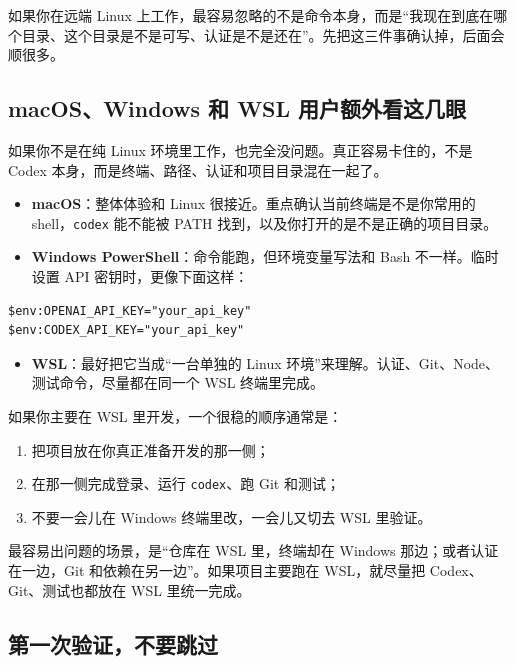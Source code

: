 \documentclass[UTF8,a4paper,12pt]{ctexart}
\begin{document}
\begin{tipbox}
如果你在远端 Linux 上工作，最容易忽略的不是命令本身，而是“我现在到底在哪个目录、这个目录是不是可写、认证是不是还在”。先把这三件事确认掉，后面会顺很多。
\end{tipbox}

\subsection{macOS、Windows 和 WSL 用户额外看这几眼}

如果你不是在纯 Linux 环境里工作，也完全没问题。真正容易卡住的，不是 Codex 本身，而是终端、路径、认证和项目目录混在一起了。

\begin{itemize}
  \item \textbf{macOS}：整体体验和 Linux 很接近。重点确认当前终端是不是你常用的 shell，\texttt{codex} 能不能被 PATH 找到，以及你打开的是不是正确的项目目录。
  \item \textbf{Windows PowerShell}：命令能跑，但环境变量写法和 Bash 不一样。临时设置 API 密钥时，更像下面这样：
\end{itemize}

\begin{lstlisting}[style=cli]
$env:OPENAI_API_KEY="your_api_key"
$env:CODEX_API_KEY="your_api_key"
\end{lstlisting}

\begin{itemize}
  \item \textbf{WSL}：最好把它当成“一台单独的 Linux 环境”来理解。认证、Git、Node、测试命令，尽量都在同一个 WSL 终端里完成。
\end{itemize}

如果你主要在 WSL 里开发，一个很稳的顺序通常是：
\begin{enumerate}
  \item 把项目放在你真正准备开发的那一侧；
  \item 在那一侧完成登录、运行 \texttt{codex}、跑 Git 和测试；
  \item 不要一会儿在 Windows 终端里改，一会儿又切去 WSL 里验证。
\end{enumerate}

\begin{warnbox}
最容易出问题的场景，是“仓库在 WSL 里，终端却在 Windows 那边；或者认证在一边，Git 和依赖在另一边”。如果项目主要跑在 WSL，就尽量把 Codex、Git、测试也都放在 WSL 里统一完成。
\end{warnbox}

\subsection{第一次验证，不要跳过}
\end{document}
